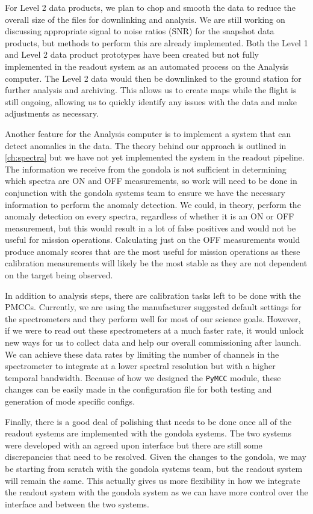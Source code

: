 For Level 2 data products, we plan to chop and smooth the data to reduce the overall size of the files for downlinking and analysis. 
We are still working on discussing appropriate signal to noise ratios (SNR) for the snapshot data products, but methods to perform this are already implemented. 
Both the Level 1 and Level 2 data product prototypes have been created but not fully implemented in the readout system as an automated process on the Analysis computer. 
The Level 2 data would then be downlinked to the ground station for further analysis and archiving.
This allows us to create maps while the flight is still ongoing, allowing us to quickly identify any issues with the data and make adjustments as necessary.

Another feature for the Analysis computer is to implement a system that can detect anomalies in the data.
The theory behind our approach is outlined in \ref{ch:spectra} but we have not yet implemented the system in the readout pipeline.
The information we receive from the gondola is not sufficient in determining which spectra are ON and OFF measurements, so work will need to be done in conjunction with the gondola systems team to ensure we have the necessary information to perform the anomaly detection.
We could, in theory, perform the anomaly detection on every spectra, regardless of whether it is an ON or OFF measurement, but this would result in a lot of false positives and would not be useful for mission operations.
Calculating just on the OFF measurements would produce anomaly scores that are the most useful for mission operations as these calibration measurements will likely be the most stable as they are not dependent on the target being observed.

In addition to analysis steps, there are calibration tasks left to be done with the PMCCs.
Currently, we are using the manufacturer suggested default settings for the spectrometers and they perform well for most of our science goals.
However, if we were to read out these spectrometers at a much faster rate, it would unlock new ways for us to collect data and help our overall commissioning after launch.
We can achieve these data rates by limiting the number of channels in the spectrometer to integrate at a lower spectral resolution but with a higher temporal bandwidth. 
Because of how we designed the \texttt{PyMCC} module, these changes can be easily made in the configuration file for both testing and generation of mode specific configs.

Finally, there is a good deal of polishing that needs to be done once all of the readout systems are implemented with the gondola systems.
The two systems were developed with an agreed upon interface but there are still some discrepancies that need to be resolved.
Given the changes to the gondola, we may be starting from scratch with the gondola systems team, but the readout system will remain the same.
This actually gives us more flexibility in how we integrate the readout system with the gondola system as we can have more control over the interface and between the two systems.